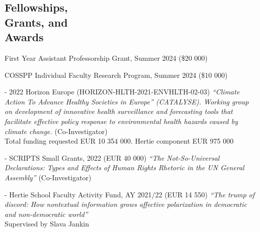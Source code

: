 \documentclass[margin,line,10.95pt]{res}
\begin{document}
\begin{resume}



\section{\sc Fellowships,   \\ Grants,  and  \\Awards}

First Year Assistant Professorship Grant, Summer 2024 (\$20 000)

\vspace*{-3.5mm}

COSSPP Individual Faculty Research Program, Summer 2024 (\$10 000)


- 2022 Horizon Europe (HORIZON-HLTH-2021-ENVHLTH-02-03) \textit{“Climate Action To Advance Healthy Societies in Europe” (CATALYSE). Working group on development of innovative health surveillance and forecasting tools that facilitate effective policy response to environmental health hazards caused by climate change.} (Co-Investigator)
\\
Total funding requested EUR 10 354 000. Hertie component EUR 975 000

\vspace*{-3.5mm}

- SCRIPTS Small Grants, 2022 (EUR 40 000) \textit{“The Not-So-Universal Declarations: Types and Effects of Human Rights Rhetoric in the UN General Assembly”} (Co-Investigator)

\vspace*{-3.5mm}

- Hertie School Faculty Activity Fund, AY 2021/22 (EUR 14 550) \textit{“The trump of discord: How nontextual information grows affective polarization in democratic and non-democratic world”} 
\\
Supervised by Slava Jankin
\\


\end{resume}
\end{document}

